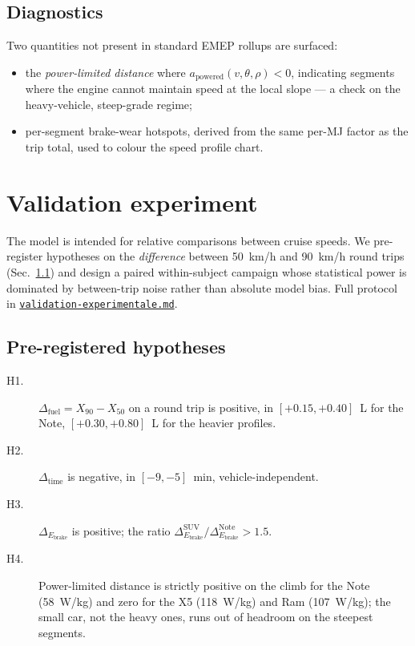 \documentclass[11pt,a4paper]{article}
\begin{document}
\subsection{Diagnostics}

Two quantities not present in standard EMEP rollups are surfaced:

\begin{itemize}
  \item the \emph{power-limited distance} where
        $a_{\text{powered}}(v, \theta, \rho) < 0$, indicating
        segments where the engine cannot maintain speed at the
        local slope --- a check on the heavy-vehicle, steep-grade
        regime;
  \item per-segment brake-wear hotspots, derived from the same
        per-MJ factor as the trip total, used to colour the speed
        profile chart.
\end{itemize}

\section{Validation experiment}

The model is intended for relative comparisons between cruise speeds.
We pre-register hypotheses on the \emph{difference} between
\SI{50}{km/h} and \SI{90}{km/h} round trips (Sec.~\ref{sec:hypotheses})
and design a paired within-subject campaign whose statistical power
is dominated by between-trip noise rather than absolute model bias.
Full protocol in
\href{https://github.com/mathieudutour/simulateur-vitesse-pollution-montagne/blob/main/validation-experimentale.md}{\texttt{validation-experimentale.md}}.

\subsection{Pre-registered hypotheses}\label{sec:hypotheses}

\begin{description}
  \item[H1.] $\Delta_{\text{fuel}} = X_{90} - X_{50}$ on a round trip
        is positive, in $[+0.15, +0.40]$~L for the Note,
        $[+0.30, +0.80]$~L for the heavier profiles.
  \item[H2.] $\Delta_{\text{time}}$ is negative, in $[-9, -5]$~min,
        vehicle-independent.
  \item[H3.] $\Delta_{E_{\text{brake}}}$ is positive; the ratio
        $\Delta_{E_{\text{brake}}}^{\text{SUV}} /
         \Delta_{E_{\text{brake}}}^{\text{Note}} > 1.5$.
  \item[H4.] Power-limited distance is strictly positive on the
        climb for the Note (\SI{58}{W/kg}) and zero for the X5
        (\SI{118}{W/kg}) and Ram (\SI{107}{W/kg}); the small car,
        not the heavy ones, runs out of headroom on the steepest
        segments.
\end{description}
\end{document}
